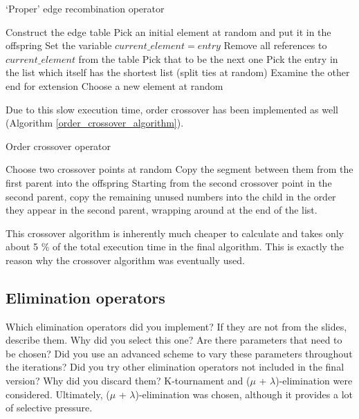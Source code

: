 \documentclass[a4paper,10pt]{article}
\newcommand{\ReplaceMe}[1]{{\color{blue}#1}}
\begin{document}
\begin{algorithm}
\caption{`Proper' edge recombination operator \cite{eiben_smith}}\label{proper_edge_crossover}
\begin{algorithmic}
\State Construct the edge table
\State Pick an initial element at random and put it in the offspring
\State Set the variable $current\_element = entry$
\State Remove all references to $current\_element$ from the table
\State Pick that to be the next one
\Else
\State Pick the entry in the list which itself has the shortest list (split ties at random)
\EndIf
{}
\State Examine the other end for extension
\Else
\State Choose a new element at random
\EndIf
\EndIf
\EndWhile
\end{algorithmic}
\end{algorithm}

Due to this slow execution time, order crossover \cite{eiben_smith} has been implemented as well (Algorithm \ref{order_crossover_algorithm}).

\begin{algorithm}
\caption{Order crossover operator \cite{eiben_smith}}\label{order_crossover_algorithm}
\begin{algorithmic}
\State Choose two crossover points at random
\State Copy the segment between them from the first parent into the offspring
\State Starting from the second crossover point in the second parent, copy the remaining unused numbers into the child in the order they appear in the second parent, wrapping around at the end of the list.
\end{algorithmic}
\end{algorithm}

This crossover algorithm is inherently much cheaper to calculate and takes only about 5 \% of the total execution time in the final algorithm. This is exactly the reason why the crossover algorithm was eventually used. 


\subsection{Elimination operators}
\label{elimination}
\ReplaceMe{Which elimination operators did you implement? If they are not from the slides, describe them. Why did you select this one? Are there parameters that need to be chosen? Did you use an advanced scheme to vary these parameters throughout the iterations? Did you try other elimination operators not included in the final version? Why did you discard them?}
K-tournament and ($ \mu $ + $ \lambda $)-elimination were considered. Ultimately, ($ \mu $ + $ \lambda $)-elimination was chosen, although it provides a lot of selective pressure. %
\end{document}
